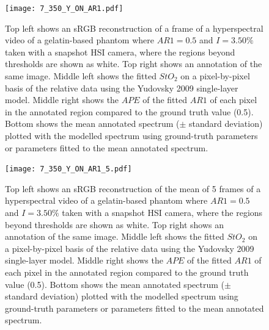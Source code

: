\begin{figure}[h!]
    \centering 
    \texttt{[image: 7\_350\_Y\_ON\_AR1.pdf]}
    \caption{Top left shows an sRGB reconstruction of a frame of a hyperspectral video of a gelatin-based phantom where $AR1=0.5$ and $I=3.50\%$ taken with a snapshot HSI camera, where the regions beyond thresholds are shown as white. Top right shows an annotation of the same image. Middle left shows the fitted $StO_2$ on a pixel-by-pixel basis of the relative data using the Yudovsky 2009 single-layer model. Middle right shows the $APE$ of the fitted $AR1$ of each pixel in the annotated region compared to the ground truth value (0.5). Bottom shows the mean annotated spectrum ($\pm$ standard deviation) plotted with the modelled spectrum using ground-truth parameters or parameters fitted to the mean annotated spectrum.}
    \label{fig:gelatinpbpeg}
\end{figure}

\begin{figure}[h!]
    \centering 
    \texttt{[image: 7\_350\_Y\_ON\_AR1\_5.pdf]}
    \caption{Top left shows an sRGB reconstruction of the mean of 5 frames of a hyperspectral video of a gelatin-based phantom where $AR1=0.5$ and $I=3.50\%$ taken with a snapshot HSI camera, where the regions beyond thresholds are shown as white. Top right shows an annotation of the same image. Middle left shows the fitted $StO_2$ on a pixel-by-pixel basis of the relative data using the Yudovsky 2009 single-layer model. Middle right shows the $APE$ of the fitted $AR1$ of each pixel in the annotated region compared to the ground truth value (0.5). Bottom shows the mean annotated spectrum ($\pm$ standard deviation) plotted with the modelled spectrum using ground-truth parameters or parameters fitted to the mean annotated spectrum.}
    \label{fig:gelatinpbpeg5}
\end{figure}

\FloatBarrier
